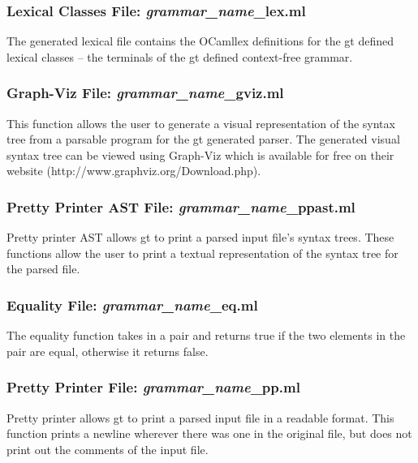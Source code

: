 \subsubsection{Lexical Classes File: \textit{grammar\_name}\_lex.ml}
The generated lexical file contains the OCamllex definitions for the gt defined lexical classes --
the terminals of the gt defined context-free grammar.

%
%
%
\subsubsection{Graph-Viz File: \textit{grammar\_name}\_gviz.ml}
This function allows the user to generate a visual representation of the syntax tree from a parsable program for the
gt generated parser. The generated visual syntax tree can be viewed using Graph-Viz which is available for free on 
their website (http://www.graphviz.org/Download.php). 

%
%
%
\subsubsection{Pretty Printer AST File: \textit{grammar\_name}\_ppast.ml}
Pretty printer AST allows gt to print a parsed input file's syntax trees. These functions allow the user to
print a textual representation of the syntax tree for the parsed file. \\

%
%
%
\subsubsection{Equality File: \textit{grammar\_name}\_eq.ml}
The equality function takes in a pair and returns true if the two elements in the pair are equal, otherwise it returns false.\\

%
%
%
\subsubsection{Pretty Printer File: \textit{grammar\_name}\_pp.ml}
Pretty printer allows gt to print a parsed input file in a readable format. This function prints a newline
wherever there was one in the original file, but does not print out the comments of the input file. \\




